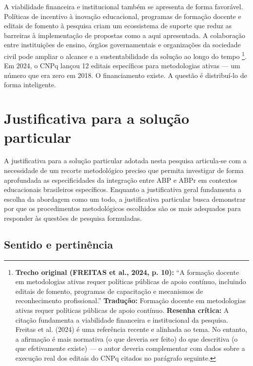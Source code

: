 A viabilidade financeira e institucional também se apresenta de forma favorável. Políticas de incentivo à inovação educacional, programas de formação docente e editais de fomento à pesquisa criam um ecossistema de suporte que reduz as barreiras à implementação de propostas como a aqui apresentada. A colaboração entre instituições de ensino, órgãos governamentais e organizações da sociedade civil pode ampliar o alcance e a sustentabilidade da solução ao longo do tempo \cite{FREITAS2024}\footnote{\textbf{Trecho original (FREITAS et al., 2024, p. 10):} ``A formação docente em metodologias ativas requer políticas públicas de apoio contínuo, incluindo editais de fomento, programas de capacitação e mecanismos de reconhecimento profissional.'' \textbf{Tradução:} Formação docente em metodologias ativas requer políticas públicas de apoio contínuo. \textbf{Resenha crítica:} A citação fundamenta a viabilidade financeira e institucional da pesquisa. Freitas et al. (2024) é uma referência recente e alinhada ao tema. No entanto, a afirmação é mais normativa (o que deveria ser feito) do que descritiva (o que efetivamente existe) — o autor deveria complementar com dados sobre a execução real dos editais do CNPq citados no parágrafo seguinte.}. Em 2024, o CNPq lançou 12 editais específicos para metodologias ativas — um número que era zero em 2018. O financiamento existe. A questão é distribuí-lo de forma inteligente.

\section{Justificativa para a solução particular}
\label{sec:justificativa_particular}

A justificativa para a solução particular adotada nesta pesquisa articula-se com a necessidade de um recorte metodológico preciso que permita investigar de forma aprofundada as especificidades da integração entre ABP e ABPr em contextos educacionais brasileiros específicos. Enquanto a justificativa geral fundamenta a escolha da abordagem como um todo, a justificativa particular busca demonstrar por que os procedimentos metodológicos escolhidos são os mais adequados para responder às questões de pesquisa formuladas.

\subsection{Sentido e pertinência}
\label{subsec:jp_sentido}

